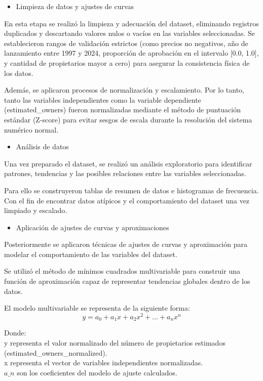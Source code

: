 \documentclass[12pt]{report}
\begin{document}
\begin{itemize}
    \item Limpieza de datos y ajustes de curvas
\end{itemize}
En esta etapa se realizó la limpieza y adecuación del dataset, eliminando registros duplicados y descartando valores nulos o vacíos en las variables seleccionadas. Se establecieron rangos de validación estrictos (como precios no negativos, año de lanzamiento entre 1997 y 2024, proporción de aprobación en el intervalo [0.0, 1.0], y cantidad de propietarios mayor a cero) para asegurar la consistencia física de los datos.

Además, se aplicaron procesos de normalización y escalamiento. Por lo tanto, tanto las variables independientes como la variable dependiente (estimated\_owners) fueron normalizadas mediante el método de puntuación estándar (Z-score) para evitar sesgos de escala durante la resolución del sistema numérico normal.

\begin{itemize}
    \item Análisis de datos
\end{itemize}
Una vez preparado el dataset, se realizó un análisis exploratorio para identificar patrones, tendencias y las posibles relaciones entre las variables seleccionadas.

Para ello se construyeron tablas de resumen de datos e histogramas de frecuencia. Con el fin de encontrar datos atípicos y el comportamiento del dataset una vez limpiado y escalado.

\begin{itemize}
    \item Aplicación de ajustes de curvas y aproximaciones
\end{itemize}
Posteriormente se aplicaron técnicas de ajustes de curvas y aproximación para modelar el comportamiento de las variables del dataset.

Se utilizó el método de mínimos cuadrados multivariable para construir una función de aproximación capaz de representar tendencias globales dentro de los datos.

El modelo multivariable se representa de la siguiente forma:
$$ y = a_0 + a_1x + a_2x^2 + \dots + a_nx^n $$

Donde:\\
y representa el valor normalizado del número de propietarios estimados (estimated\_owners\_normalized).\\
x representa el vector de variables independientes normalizadas.\\
$a\_n$ son los coeficientes del modelo de ajuste calculados.
\end{document}
